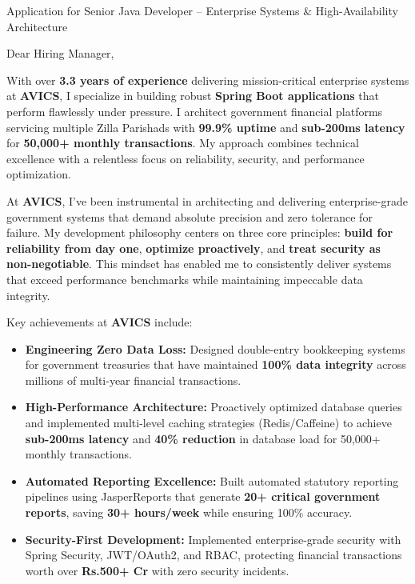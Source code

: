 \documentclass[10pt,a4paper]{article}
\begin{document}
\vspace{0.3cm}

 {\color{SlateGrey}Application for Senior Java Developer -- Enterprise Systems \& High-Availability Architecture}

\vspace{0.3cm}

\noindent Dear Hiring Manager,

\vspace{0.2cm}

With over \textbf{3.3 years of experience} delivering mission-critical enterprise systems at \textbf{AVICS}, I specialize in building robust \textbf{Spring Boot applications} that perform flawlessly under pressure. I architect government financial platforms servicing multiple Zilla Parishads with \textbf{99.9\% uptime} and \textbf{sub-200ms latency} for \textbf{50,000+ monthly transactions}. My approach combines technical excellence with a relentless focus on reliability, security, and performance optimization.

At \textbf{AVICS}, I've been instrumental in architecting and delivering enterprise-grade government systems that demand absolute precision and zero tolerance for failure. My development philosophy centers on three core principles: \textbf{build for reliability from day one}, \textbf{optimize proactively}, and \textbf{treat security as non-negotiable}. This mindset has enabled me to consistently deliver systems that exceed performance benchmarks while maintaining impeccable data integrity. 

Key achievements at \textbf{AVICS} include:
\begin{itemize}[leftmargin=*,label={\color{PastelRed}\faCheckCircle}]
    \item \textbf{Engineering Zero Data Loss:} Designed double-entry bookkeeping systems for government treasuries that have maintained \textbf{100\% data integrity} across millions of multi-year financial transactions.
    \item \textbf{High-Performance Architecture:} Proactively optimized database queries and implemented multi-level caching strategies (Redis/Caffeine) to achieve \textbf{sub-200ms latency} and \textbf{40\% reduction} in database load for 50,000+ monthly transactions.
    \item \textbf{Automated Reporting Excellence:} Built automated statutory reporting pipelines using JasperReports that generate \textbf{20+ critical government reports}, saving \textbf{30+ hours/week} while ensuring 100\% accuracy.
    \item \textbf{Security-First Development:} Implemented enterprise-grade security with Spring Security, JWT/OAuth2, and RBAC, protecting financial transactions worth over \textbf{Rs.500+ Cr} with zero security incidents.
\end{itemize}
\end{document}
